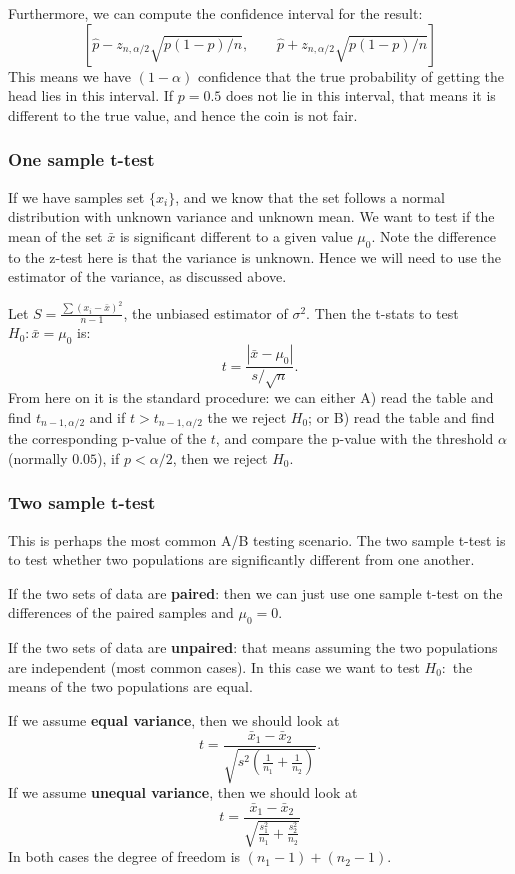 \documentclass[12pt]{amsart}
\numberwithin{equation}{section}
\theoremstyle{plain}
\theoremstyle{definition}
\begin{document}
Furthermore, we can compute the confidence interval for the result:
$$
[\hat p-z_{n,\alpha/2}\sqrt{p(1-p)/n}, \qquad \hat p+z_{n,\alpha/2}\sqrt{p(1-p)/n}]
$$
This means we have $(1-\alpha)$ confidence that the true probability of getting the head lies in this interval. If $p=0.5$ does not lie in this interval, that means it is different to the true value, and hence the coin is not fair.

\subsubsection{One sample t-test}

If we have samples set $\{x_i\}$, and we know that the set follows a normal distribution with unknown variance and unknown mean. We want to test if the mean of the set $\bar x$ is significant different to a given value $\mu_0$. Note the difference to the z-test here is that the variance is unknown. Hence we will need to use the estimator of the variance, as discussed above.

Let $S = \frac{\sum (x_i-\bar x)^2}{n-1}$, the unbiased estimator of $\sigma^2$. Then the t-stats to test $H_0: \bar x=\mu_0$ is:
$$
t = \frac{|\bar x-\mu_0|}{s/\sqrt{n}}.
$$
From here on it is the standard procedure: we can either A) read the table and find $t_{n-1,\alpha/2}$ and if $t>t_{n-1,\alpha/2}$ the we reject $H_0$; or B) read the table and find the corresponding p-value of the $t$, and compare the p-value with the threshold $\alpha$ (normally $0.05$), if $p<\alpha/2$, then we reject $H_0$.

\subsubsection{Two sample t-test}
This is perhaps the most common A/B testing scenario. The two sample t-test is to test whether two populations are significantly different from one another.

If the two sets of data are {\bf paired}: then we can just use one sample t-test on the differences of the paired samples and $\mu_0 = 0$.

If the two sets of data are {\bf unpaired}: that means assuming the two populations are independent (most common cases). In this case we want to test $H_0:$ the means of the two populations are equal.

If we assume {\bf equal variance}, then we should look at 
$$
t = \frac{\bar x_1-\bar x_2}{\sqrt{s^2(\frac{1}{n_1}+\frac{1}{n_2})}}.
$$
If we assume {\bf unequal variance}, then we should look at 
$$
t = \frac{\bar x_1-\bar x_2}{\sqrt{\frac{s_1^2}{n_1}+\frac{s_2^2}{n_2}}}
$$
In both cases the degree of freedom is $(n_1-1)+(n_2-1)$.
\end{document}
